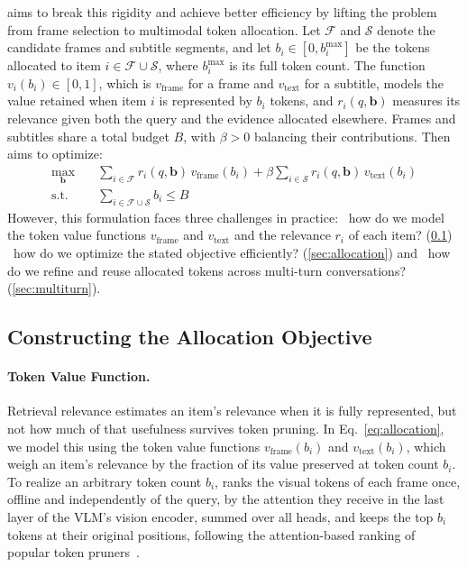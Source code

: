 \name aims to break this rigidity and achieve better efficiency by lifting the problem from frame selection to multimodal token allocation. Let $\mathcal F$ and $\mathcal S$ denote the candidate frames and subtitle segments, and let $b_i\in[0,b_i^{\max}]$ be the tokens allocated to item $i\in\mathcal F\cup\mathcal S$, where $b_i^{\max}$ is its full token count. The function $v_i(b_i)\in[0,1]$, which is $v_{\text{frame}}$ for a frame and $v_{\text{text}}$ for a subtitle, models the value retained when item $i$ is represented by $b_i$ tokens, and $r_i(q,\mathbf b)$ measures its relevance given both the query and the evidence allocated elsewhere. Frames and subtitles share a total budget $B$, with $\beta>0$ balancing their contributions. Then \name aims to optimize:
\begin{equation}
\begin{aligned}
  \max_{\mathbf{b}}\quad & \sum_{i \in \mathcal{F}} r_i(q, \mathbf{b})\, v_{\text{frame}}(b_i) + \beta \sum_{i \in \mathcal{S}} r_i(q, \mathbf{b})\, v_{\text{text}}(b_i) \\
  \text{s.t.}\quad & \sum_{i \in \mathcal{F} \cup \mathcal{S}} b_i \le B
\end{aligned}
  \label{eq:allocation}
\end{equation}
 However, this formulation faces three challenges in practice: ~how do we model the token value functions $v_{\text{frame}}$ and $v_{\text{text}}$ and the relevance $r_i$ of each item? (\cref{sec:objective}) ~how do we optimize the stated objective efficiently? (\cref{sec:allocation}) and ~how do we refine and reuse allocated tokens across multi-turn conversations? (\cref{sec:multiturn}).

\subsection{Constructing the Allocation Objective}
\label{sec:objective}




\paragraph{Token Value Function.}
Retrieval relevance estimates an item's relevance when it is fully represented, but not how much of that usefulness survives token pruning. In Eq.~\eqref{eq:allocation}, we model this using the token value functions $v_{\text{frame}}(b_i)$ and $v_{\text{text}}(b_i)$, which weigh an item's relevance by the fraction of its value preserved at token count $b_i$. To realize an arbitrary token count $b_i$, \name ranks the visual tokens of each frame once, offline and independently of the query, by the attention they receive in the last layer of the VLM's vision encoder, summed over all heads, and keeps the top $b_i$ tokens at their original positions, following the attention-based ranking of popular token pruners~\cite{chen2024fastv,yang2024visionzip}.

